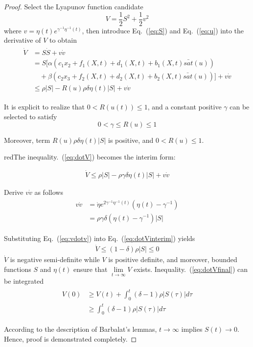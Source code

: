 \begin{proof}
Select the Lyapunov function candidate
\begin{equation}
V = \frac{1}{2}S^2+\frac{1}{2}v^2\label{eq:V}
\end{equation}
where $v = {\eta}(t)e^{\gamma^{-1}{\eta}^{-1}(t)}$, then introduce Eq.~(\ref{eq:S}) and Eq.~(\ref{eq:u}) into the derivative of $V$ to obtain
\begin{align}
\begin{split}
\dot{V} &= S\dot S+v\dot v\\
        &= S[\alpha(c_1x_2+f_1(X,t)+d_1(X,t)+b_1(X,t)\bar{sat}(u))\\
        &\quad+\beta(c_2x_3+f_2(X,t)+d_2(X,t)+b_2(X,t)\bar{sat}(u))]+v\dot v\\
        &\le \rho\vert S\vert - R(u)\rho\delta\eta(t)\vert S\vert +v\dot v\label{eq:dotV}
\end{split}
\end{align}\par
It is explicit to realize that $0 < R(u(t)) \le 1$, and a constant positive $\gamma$ can be selected to satisfy
\begin{equation}
0<\gamma\le R(u)\le 1 \label{eq:utl}
\end{equation}\par
Moreover, term $R(u)\rho\delta\eta(t)\vert S\vert$ is positive, and $0< R(u)\le 1$. \begin{color}{red}The inequality.~(\ref{eq:dotV}) becomes the interim form:\end{color}
\begin{align}
\dot{V} \le \rho\vert S\vert - \rho\gamma\delta\eta(t)\vert S\vert +v\dot v\label{eq:dotVinterim}
\end{align}\par
Derive $v\dot v$ as follows
\begin{align}
\begin{split}
v\dot v &= \dot{\eta}e^{2\gamma^{-1}\eta^{-1}(t)}(\eta(t)-\gamma^{-1})\\
        &= \rho\gamma\delta(\eta(t)-\gamma^{-1})\vert S\vert\label{eq:vdotv}
\end{split}
\end{align}\par
Substituting Eq.~(\ref{eq:vdotv}) into Eq.~(\ref{eq:dotVinterim}) yields
\begin{align}
\dot{V} \le (1 -\delta)\rho\vert S\vert\le 0 \label{eq:dotVfinal}
\end{align}
$\dot{V}$ is negative semi-definite while $V$ is positive definite, and moreover, bounded functions $S$ and ${\eta}(t)$ ensure that $\lim\limits_{t\to\infty}V$ exists. Inequality.~(\ref{eq:dotVfinal}) can be integrated
\begin{align}
\begin{split}
V(0) &\ge V(t) + \int_{0}^{t}(\delta-1)\rho\vert S(\tau)\vert d\tau\\
&\ge \int_{0}^{t}(\delta-1)\rho\vert S(\tau)\vert d\tau\label{eq:V10}
\end{split}
\end{align}\par
According to the description of Barbalat's lemmas, $t\to\infty$ implies $S(t)\to 0$. Hence, proof is demonstrated completely.
\end{proof}
